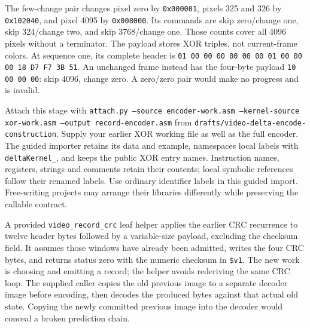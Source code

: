 The few-change pair changes pixel zero by \texttt{0x000001}, pixels 325 and 326
by \texttt{0x102040}, and pixel 4095 by \texttt{0x008000}. Its commands are
skip zero/change one, skip 324/change two, and skip 3768/change one. Those counts
cover all 4096 pixels without a terminator. The payload stores XOR triples, not
current-frame colors. At sequence one, its complete header is
\texttt{01 00 00 00 00 00 00 01 00 00 00 18 D7 F7 3B 51}.
An unchanged frame instead has the four-byte payload \texttt{10 00 00 00}:
skip 4096, change zero. A zero/zero pair would make no progress and is invalid.

Attach this stage with \texttt{attach.py --source encoder-work.asm --kernel-source
  xor-work.asm --output record-encoder.asm} from
\texttt{drafts/video-delta-encode-construction}. Supply your earlier XOR working
file as well as the full encoder. The guided importer retains its data and example,
namespaces local labels with \texttt{deltaKernel\_}, and keeps the public XOR entry
names. Instruction names, registers, strings and comments retain their contents;
local symbolic references follow their renamed labels. Use ordinary identifier
labels in this guided import. Free-writing projects may arrange their libraries
differently while preserving the callable contract.

A provided \texttt{video\_record\_crc} leaf helper applies the earlier CRC recurrence
to twelve header bytes followed by a variable-size payload, excluding the checksum
field. It assumes those windows have already been admitted, writes the four CRC
bytes, and returns status zero with the numeric checksum in \texttt{\$v1}. The
new work is choosing and emitting a record; the helper avoids rederiving the same
CRC loop. The supplied caller copies the old previous image to a separate decoder
image before encoding, then decodes the produced bytes against that actual old
state. Copying the newly committed previous image into the decoder would conceal
a broken prediction chain.

